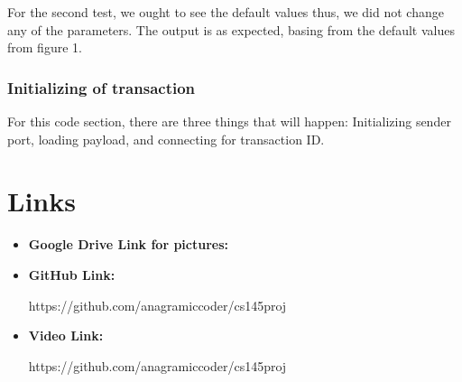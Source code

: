 \documentclass[a4paper]{article} %
\begin{document}
    For the second test, we ought to see the default values thus, we did not change
    any of the parameters. The output is as expected, basing from the
    default values from figure 1.
    \subsubsection{Initializing of transaction}
    For this code section, there are three things that will happen: Initializing sender port, loading payload, and connecting
    for transaction ID.
    \begin{center}
    \end{center}

\section{Links}
\begin{itemize}
    \item \hypertarget{glink}{\textbf{Google Drive Link for pictures:}} 
    \item \hypertarget{glink}{\textbf{GitHub Link:}} https://github.com/anagramiccoder/cs145proj
    \item \hypertarget{glink}{\textbf{Video Link:}} https://github.com/anagramiccoder/cs145proj
\end{itemize}
\end{document}
